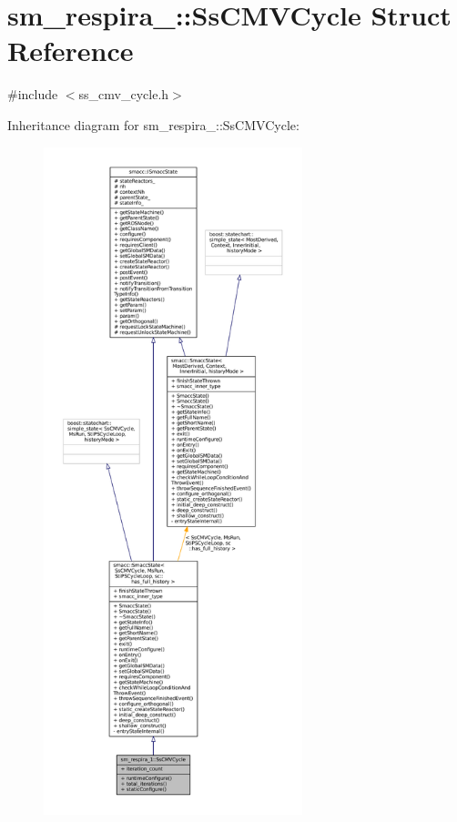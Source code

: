 \hypertarget{structsm__respira__1_1_1SsCMVCycle}{}\section{sm\+\_\+respira\+\_\+:\+:Ss\+C\+M\+V\+Cycle Struct Reference}
\label{structsm__respira__1_1_1SsCMVCycle}


{\ttfamily \#include $<$ss\+\_\+cmv\+\_\+cycle.\+h$>$}



Inheritance diagram for sm\+\_\+respira\+\_\+:\+:Ss\+C\+M\+V\+Cycle\+:
\nopagebreak
\begin{figure}[H]
\begin{center}
\leavevmode
\includegraphics[height=550pt]{structsm__respira__1_1_1SsCMVCycle__inherit__graph}
\end{center}
\end{figure}


